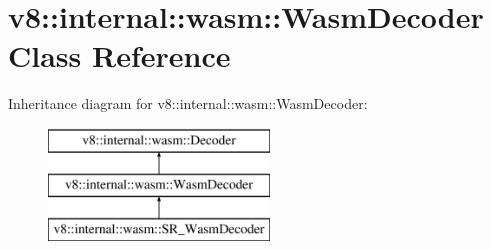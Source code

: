 \hypertarget{classv8_1_1internal_1_1wasm_1_1_wasm_decoder}{}\section{v8\+:\+:internal\+:\+:wasm\+:\+:Wasm\+Decoder Class Reference}
\label{classv8_1_1internal_1_1wasm_1_1_wasm_decoder}
Inheritance diagram for v8\+:\+:internal\+:\+:wasm\+:\+:Wasm\+Decoder\+:\begin{figure}[H]
\begin{center}
\leavevmode
\includegraphics[height=3.000000cm]{classv8_1_1internal_1_1wasm_1_1_wasm_decoder}
\end{center}
\end{figure}
